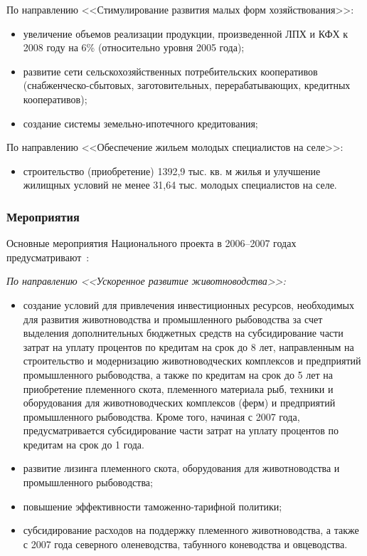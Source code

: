 \documentclass[article, 12pt, russian, oneside]{ncc}
\begin{document}
По направлению <<Стимулирование развития малых форм хозяйствования>>:

\begin{itemize}
\item увеличение объемов реализации продукции, произведенной ЛПХ и КФХ
  к 2008 году на 6\% (относительно уровня 2005 года);
\item развитие сети сельскохозяйственных потребительских кооперативов
  (снабженческо-сбытовых, заготовительных, перерабатывающих, кредитных
  кооперативов);
\item создание системы земельно-ипотечного кредитования;
\end{itemize}

По направлению <<Обеспечение жильем молодых специалистов на селе>>:

\begin{itemize}
\item строительство (приобретение) 1392,9 тыс. кв. м жилья и улучшение
  жилищных условий не менее 31,64 тыс. молодых специалистов на селе.
\end{itemize}


\subsubsection{Мероприятия}

Основные мероприятия Национального проекта в 2006--2007 годах
предусматривают~\cite{APK_Waitings}:

\emph{По направлению <<Ускоренное развитие животноводства>>:}

\begin{itemize}
\item создание условий для привлечения инвестиционных ресурсов,
  необходимых для развития животноводства и промышленного рыбоводства
  за счет выделения дополнительных бюджетных средств на субсидирование
  части затрат на уплату процентов по кредитам на срок до 8 лет,
  направленным на строительство и модернизацию животноводческих
  комплексов и предприятий промышленного рыбоводства, а также по
  кредитам на срок до 5 лет на приобретение племенного скота,
  племенного материала рыб, техники и оборудования для
  животноводческих комплексов (ферм) и предприятий промышленного
  рыбоводства. Кроме того, начиная с 2007 года, предусматривается
  субсидирование части затрат на уплату процентов по кредитам на срок
  до 1 года.
\item развитие лизинга племенного скота, оборудования для
  животноводства и промышленного рыбоводства;
\item повышение эффективности таможенно-тарифной политики;
\item субсидирование расходов на поддержку племенного животноводства,
  а также с 2007 года северного оленеводства, табунного коневодства и
  овцеводства.
\end{itemize}
\end{document}
